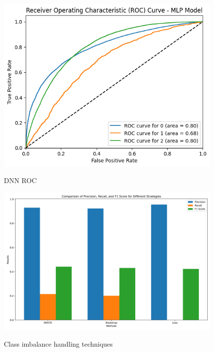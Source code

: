\documentclass[conference]{IEEEtran}
\begin{document}
    \begin{figure}[h]
        \centering
        \includegraphics[scale=0.39]{ffnnROC.png}
        \label{fig:ffnnROC}
        \caption{DNN ROC}
    \end{figure}

    \begin{figure}[h]
        \centering
        \includegraphics[scale = 0.34]{stratcomparison_high_dpi.png}
        \label{fig:stratcomparison}
        \caption{Class imbalance handling techniques}
    \end{figure}

        
\end{document}
